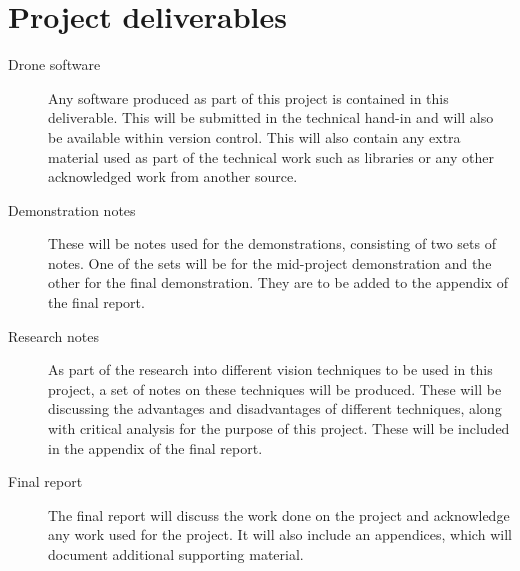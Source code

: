\documentclass[11pt,fleqn,twoside]{article}
\begin{document}
\section{Project deliverables}
\begin{description}
  
  \item[Drone software]
    Any software produced as part of this project is contained in this deliverable. This will be submitted in the technical hand-in and will also be available within version control. This will also contain any extra material used as part of the technical work such as libraries or any other acknowledged work from another source.
  \item[Demonstration notes]
    These will be notes used for the demonstrations, consisting of two sets of notes. One of the sets will be for the mid-project demonstration and the other for the final demonstration. They are to be added to the appendix of the final report.
  \item[Research notes]
    As part of the research into different vision techniques to be used in this project, a set of notes on these techniques will be produced. These will be discussing the advantages and disadvantages of different techniques, along with critical analysis for the purpose of this project. These will be included in the appendix of the final report.
  \item[Final report]
    The final report will discuss the work done on the project and acknowledge any work used for the project. It will also include an appendices, which will document additional supporting material. 
\end{description}
%
%
%
\end{document}
